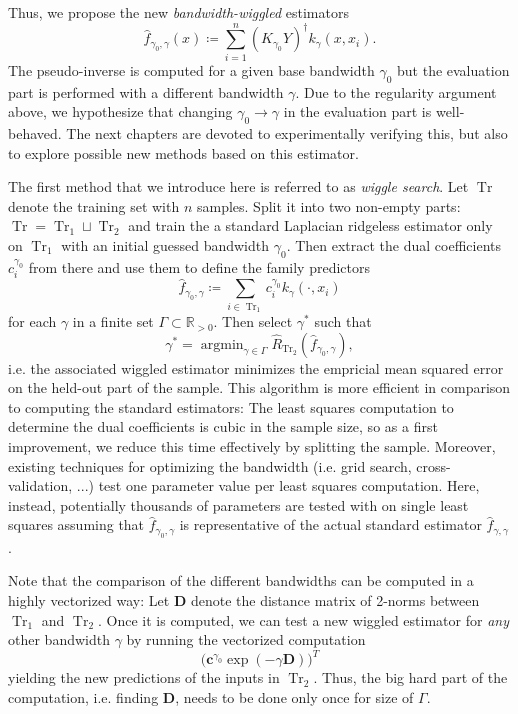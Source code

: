 \documentclass[12pt]{amsart}
\newcommand{\R}{\mathbb{R}}
\DeclareMathOperator{\Tr}{Tr}
\DeclareMathOperator{\argmin}{argmin}
\begin{document}
Thus, we propose the new \emph{bandwidth-wiggled} estimators
\[ \hat f_{\gamma_0, \gamma}(x) \coloneqq 
    \sum_{i=1}^n (K_{\gamma_0} Y)^\dagger k_\gamma(x, x_i). \]
The pseudo-inverse is computed for a given base bandwidth $\gamma_0$
but the evaluation part is performed with a different bandwidth $\gamma$.
Due to the regularity argument above, we hypothesize that 
changing $\gamma_0 \to \gamma$ in the evaluation part is well-behaved.
The next chapters are devoted to experimentally verifying this, but 
also to explore possible new methods based on this estimator.

The first method that we introduce here is referred to as 
\emph{wiggle search}.
Let $\Tr$ denote the training set with $n$ samples.
Split it into two non-empty parts: $\Tr = \Tr_1 \sqcup \Tr_2$
and train the a standard Laplacian ridgeless estimator only on
$\Tr_1$ with an initial guessed bandwidth $\gamma_0$.
Then extract the dual coefficients $c_i^{\gamma_0}$ from there 
and use them to define the family predictors 
\[ \hat f_{\gamma_0,\gamma} 
    \coloneqq \sum_{i \in \Tr_1} c_i^{\gamma_0} k_\gamma(\cdot, x_i) \]
for each $\gamma$ in a finite set $\Gamma \subset \R_{> 0}$.
Then select $\gamma^*$ such that 
\[ \gamma^* = \argmin_{\gamma \in \Gamma} 
    \hat R_{\Tr_2} \left(\hat f_{\gamma_0,\gamma}\right), \]
i.e. the associated wiggled estimator minimizes the empricial mean
squared error on the held-out part of the sample.
This algorithm is more efficient in comparison to computing the 
standard estimators:
The least squares computation to determine the dual coefficients is
cubic in the sample size, so as a first improvement, we reduce this 
time effectively by splitting the sample.
Moreover, existing techniques for optimizing the bandwidth
(i.e. grid search, cross-validation, ...) test one parameter value 
per least squares computation.
Here, instead, potentially thousands of parameters are tested with 
on single least squares assuming that $\hat f_{\gamma_0,\gamma}$ 
is representative of the actual standard estimator 
$\hat f_{\gamma,\gamma}$.

Note that the comparison of the different bandwidths can be computed 
in a highly vectorized way:
Let $\mathbf D$ denote the distance matrix of 2-norms between $\Tr_1$ and 
$\Tr_2$.
Once it is computed, we can test a new wiggled estimator 
for \emph{any} other bandwidth $\gamma$ by running
the vectorized computation
\[ \big( \mathbf c^{\gamma_0} \exp(-\gamma \mathbf D) \big)^T \]
yielding the new predictions of the inputs in $\Tr_2$.
Thus, the big hard part of the computation, i.e. finding $\mathbf D$,
needs to be done only once for size of $\Gamma$.
\end{document}

